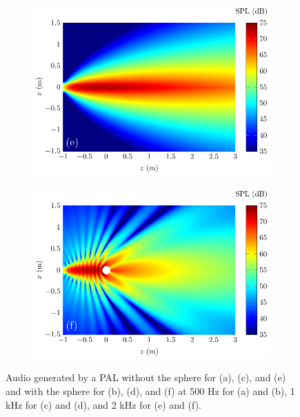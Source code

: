 \begin{figure}[!htb]
    \\
    \begin{subfigure}{0.49\textwidth}
        \centering
        \includegraphics[width = \textwidth]{fig/PalNoSphere_2D_211211E_2000Hz_211211H}
    \end{subfigure}
    \begin{subfigure}{0.49\textwidth}
        \centering
        \includegraphics[width = \textwidth]{fig/PalSphere_211205D_Test2D_Kuznetsov_2000Hz_211211K}
    \end{subfigure}
    \caption{Audio  generated by a PAL without the sphere for (a), (c), and (e) and with the sphere for (b), (d), and (f) at 500 Hz for (a) and (b), 1 kHz for (c) and (d), and 2 kHz for (e) and (f).}
    \label{fig:scat_result_pal}
\end{figure}

